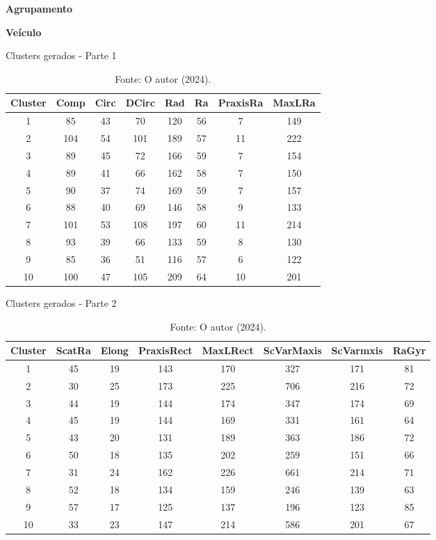 \begin{adjustwidth}{1em}{}
\textbf{Agrupamento}
\end{adjustwidth}

\begin{center}
    \textbf{Veículo}
\end{center}

\begin{table}[H]
\centering
\caption{Clusters gerados - Parte 1}
\begin{tabular}{|c|c|c|c|c|c|c|c|}
\hline
Cluster & Comp & Circ & DCirc & Rad & Ra & PraxisRa & MaxLRa \\ \hline
1  & 85  & 43  & 70  & 120 & 56 & 7  & 149 \\ \hline
2  & 104 & 54  & 101 & 189 & 57 & 11 & 222 \\ \hline
3  & 89  & 45  & 72  & 166 & 59 & 7  & 154 \\ \hline
4  & 89  & 41  & 66  & 162 & 58 & 7  & 150 \\ \hline
5  & 90  & 37  & 74  & 169 & 59 & 7  & 157 \\ \hline
6  & 88  & 40  & 69  & 146 & 58 & 9  & 133 \\ \hline
7  & 101 & 53  & 108 & 197 & 60 & 11 & 214 \\ \hline
8  & 93  & 39  & 66  & 133 & 59 & 8  & 130 \\ \hline
9  & 85  & 36  & 51  & 116 & 57 & 6  & 122 \\ \hline
10 & 100 & 47  & 105 & 209 & 64 & 10 & 201 \\ \hline
\end{tabular}
\caption*{Fonte: O autor (2024).}
\end{table}

\begin{table}[H]
\centering
\caption{Clusters gerados - Parte 2}
\begin{tabular}{|c|c|c|c|c|c|c|c|}
\hline
Cluster & ScatRa & Elong & PraxisRect & MaxLRect & ScVarMaxis & ScVarmxis & RaGyr \\ \hline
1  & 45 & 19 & 143 & 170 & 327 & 171 & 81 \\ \hline
2  & 30 & 25 & 173 & 225 & 706 & 216 & 72 \\ \hline
3  & 44 & 19 & 144 & 174 & 347 & 174 & 69 \\ \hline
4  & 45 & 19 & 144 & 169 & 331 & 161 & 64 \\ \hline
5  & 43 & 20 & 131 & 189 & 363 & 186 & 72 \\ \hline
6  & 50 & 18 & 135 & 202 & 259 & 151 & 66 \\ \hline
7  & 31 & 24 & 162 & 226 & 661 & 214 & 71 \\ \hline
8  & 52 & 18 & 134 & 159 & 246 & 139 & 63 \\ \hline
9  & 57 & 17 & 125 & 137 & 196 & 123 & 85 \\ \hline
10 & 33 & 23 & 147 & 214 & 586 & 201 & 67 \\ \hline
\end{tabular}
\caption*{Fonte: O autor (2024).}
\end{table}

